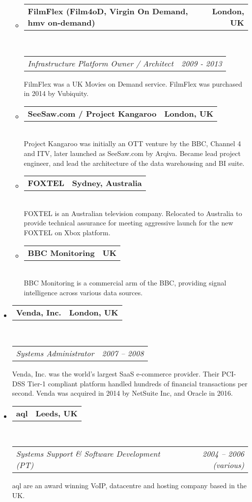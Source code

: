 \documentclass[10pt,a4paper]{article}
\makeatletter
\newcommand{\headerrow}[2]
{\begin{tabular*}{\linewidth}{l@{\extracolsep{\fill}}r}
    #1 &
    #2 \\
\end{tabular*}}
\makeatother
\begin{document}
\begin{itemize}
\begin{itemize}
            \item 
            \headerrow
                {\textbf{FilmFlex (Film4oD, Virgin On Demand, hmv on-demand)}}
                {\textbf{London, UK}}
            \\
            \headerrow
                {\emph{Infrastructure Platform Owner / Architect}}
                {\emph{2009 - 2013}}
                FilmFlex was a UK Movies on Demand service. FilmFlex was purchased in 2014 by Vubiquity.
            \item 
            \headerrow
                {\textbf{SeeSaw.com / Project Kangaroo}}
                {\textbf{London, UK}}
            \\
                Project Kangaroo was initially an OTT venture by the BBC, Channel 4 and ITV, later launched as SeeSaw.com by Arqiva. Became lead project engineer, and lead the architecture of the data warehousing and BI suite.
            \item 
            \headerrow
                {\textbf{FOXTEL}}
                {\textbf{Sydney, Australia}}
            \\
                FOXTEL is an Australian television company. Relocated to Australia to provide technical assurance for meeting aggressive launch for the new FOXTEL on Xbox platform.
            \item 
            \headerrow
                {\textbf{BBC Monitoring}}
                {\textbf{UK}}
            \\
                BBC Monitoring is a commercial arm of the BBC, providing signal intelligence across various data sources.
        \end{itemize}

    \item
        \headerrow
            {\textbf{Venda, Inc.}}
            {\textbf{London, UK}}
        \\
        \headerrow
            {\emph{Systems Administrator}}
            {\emph{2007 -- 2008}}
    
            Venda, Inc. was the world's largest SaaS e-commerce provider. Their PCI-DSS Tier-1 compliant platform handled hundreds of financial transactions per second. Venda was acquired in 2014 by NetSuite Inc, and Oracle in 2016.
    \item
        \headerrow
            {\textbf{aql}}
            {\textbf{Leeds, UK}}
        \\
        \headerrow
            {\emph{Systems Support \& Software Development (PT)}}
            {\emph{2004 -- 2006 (various)}}
    
            aql are an award winning VoIP, datacentre and hosting company based in the UK.
\end{itemize}
\end{document}

